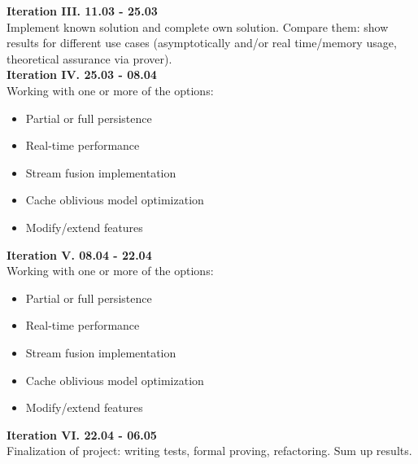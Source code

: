\documentclass[sigconf]{acmart}
\begin{document}
\textbf{Iteration III. 11.03 - 25.03}\\
Implement known solution and complete own solution. Compare them: show results for different use cases (asymptotically and/or real time/memory usage, theoretical assurance via prover).   \\

\textbf{Iteration IV. 25.03 - 08.04}\\
Working with one or more of the options:
\begin{itemize} 
\item Partial or full persistence
\item Real-time performance
\item Stream fusion implementation
\item Cache oblivious model optimization
\item Modify/extend features
\end{itemize} 
\hfill

\textbf{Iteration V. 08.04 - 22.04} \\
Working with one or more of the options:
\begin{itemize} 
\item Partial or full persistence
\item Real-time performance
\item Stream fusion implementation
\item Cache oblivious model optimization
\item Modify/extend features
\end{itemize}
\hfill \break
\textbf{Iteration VI. 22.04 - 06.05} \\
Finalization of project: writing tests, formal proving, refactoring. Sum up results.
\end{document}
